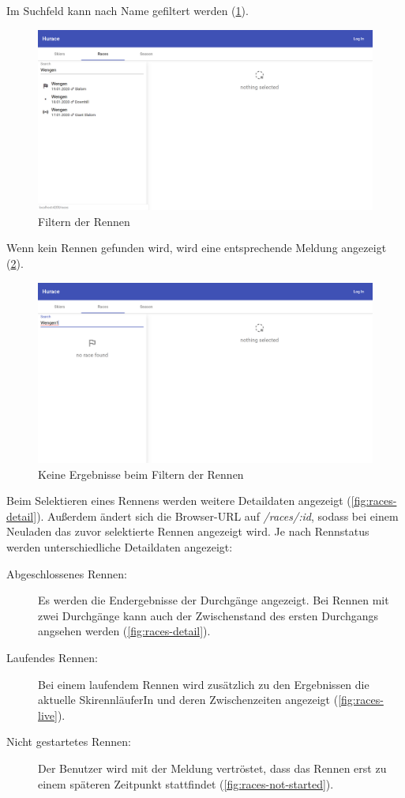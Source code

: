 Im Suchfeld kann nach Name gefiltert werden (\cref{fig:races-search-success}).
\begin{figure}[H]
    \centering
    \includegraphics[width=0.9\linewidth]{images/races-search-success}
    \caption{Filtern der Rennen}
\label{fig:races-search-success}
\end{figure}

Wenn kein Rennen gefunden wird, wird eine entsprechende Meldung angezeigt (\cref{fig:races-search-error}).
\begin{figure}[H]
    \centering
    \includegraphics[width=0.9\linewidth]{images/races-search-error}
    \caption{Keine Ergebnisse beim Filtern der Rennen}
\label{fig:races-search-error}
\end{figure}

Beim Selektieren eines Rennens werden weitere Detaildaten angezeigt (\cref{fig:races-detail}).
Außerdem ändert sich die Browser-URL auf \emph{/races/:id}, sodass bei einem Neuladen das zuvor selektierte Rennen angezeigt wird.
Je nach Rennstatus werden unterschiedliche Detaildaten angezeigt:

\begin{description}
    \item[Abgeschlossenes Rennen:] Es werden die Endergebnisse der Durchgänge angezeigt. Bei Rennen mit zwei Durchgänge kann auch der Zwischenstand des ersten Durchgangs angsehen werden (\cref{fig:races-detail}).
    \item[Laufendes Rennen:] Bei einem laufendem Rennen wird zusätzlich zu den Ergebnissen die aktuelle SkirennläuferIn und deren Zwischenzeiten angezeigt (\cref{fig:races-live}).
    \item[Nicht gestartetes Rennen:] Der Benutzer wird mit der Meldung vertröstet, dass das Rennen erst zu einem späteren Zeitpunkt stattfindet (\cref{fig:races-not-started}).
\end{description}

